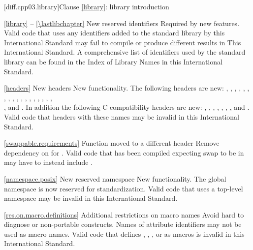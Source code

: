 [diff.cpp03.library]{Clause \ref{library}: library introduction}

\ref{library} -- \ref{\lastlibchapter}
\change New reserved identifiers
\rationale Required by new features.
\effect
Valid \CppIII code that uses any identifiers added to the \Cpp standard
library by this International Standard may fail to compile or produce different
results in This International Standard. A comprehensive list of identifiers used
by the \Cpp standard library can be found in the Index of Library Names in this
International Standard.

\ref{headers}
\change New headers
\rationale New functionality.
\effect
The following \Cpp headers are new:
,
,
,
,
,
,
,
,
,
,
,
,
,
,
,
,
,
,\\
,
and
.
In addition the following C compatibility headers are new:
,
,
,
,
,
,
,
and
.
Valid \CppIII code that  headers with these names may be
invalid in this International Standard.

\ref{swappable.requirements}
\effect Function  moved to a different header
\rationale Remove dependency on  for .
\effect Valid \CppIII code that has been compiled expecting swap to be in
 may have to instead include .

\ref{namespace.posix}
\change New reserved namespace
\rationale New functionality.
\effect
The global namespace  is now reserved for standardization. Valid
\CppIII code that uses a top-level namespace  may be invalid in
this International Standard.

\ref{res.on.macro.definitions}
\change Additional restrictions on macro names
\rationale Avoid hard to diagnose or non-portable constructs.
\effect
Names of attribute identifiers may not be used as macro names. Valid  code that defines , ,
, or  as macros is invalid in this
International Standard.

